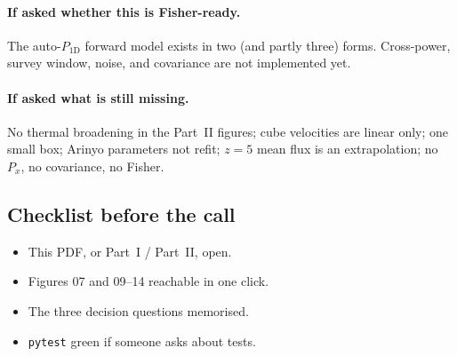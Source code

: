 \documentclass[11pt]{article}
\begin{document}
\paragraph{If asked whether this is Fisher-ready.}
The auto-$P_{1\mathrm{D}}$ forward model exists in two (and partly three) forms.
Cross-power, survey window, noise, and covariance are not implemented yet.

\paragraph{If asked what is still missing.}
No thermal broadening in the Part~II figures; cube velocities are linear only; one small box; Arinyo parameters not refit; $z=5$ mean flux is an extrapolation; no $P_x$, no covariance, no Fisher.

\subsection*{Checklist before the call}

\begin{itemize}
\item[$\square$] This PDF, or Part~I / Part~II, open.
\item[$\square$] Figures 07 and 09--14 reachable in one click.
\item[$\square$] The three decision questions memorised.
\item[$\square$] \texttt{pytest} green if someone asks about tests.
\end{itemize}
\end{document}
